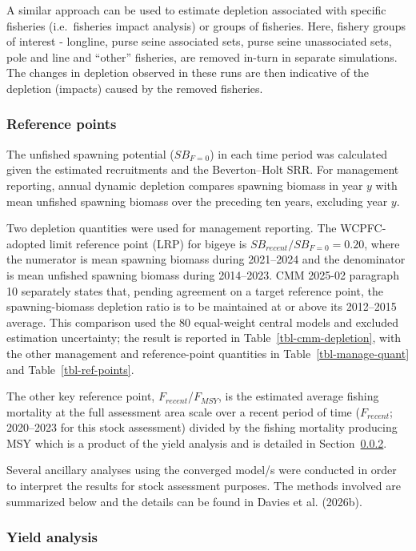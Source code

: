 \documentclass[
  english,
  a4paper,
  a4paper,
  11pt]{SCreport}
\begin{document}
A similar approach can be used to estimate depletion associated with
specific fisheries (i.e.~fisheries impact analysis) or groups of
fisheries. Here, fishery groups of interest - longline, purse seine
associated sets, purse seine unassociated sets, pole and line and
``other'' fisheries, are removed in-turn in separate simulations. The
changes in depletion observed in these runs are then indicative of the
depletion (impacts) caused by the removed fisheries.

\subsubsection{Reference points}\label{sec-methods-reference-points}

The unfished spawning potential (\(SB_{F=0}\)) in each time period was
calculated given the estimated recruitments and the Beverton--Holt SRR.
For management reporting, annual dynamic depletion compares spawning
biomass in year \(y\) with mean unfished spawning biomass over the
preceding ten years, excluding year \(y\).

Two depletion quantities were used for management reporting. The
WCPFC-adopted limit reference point (LRP) for bigeye is
\(SB_{recent}/SB_{F=0}=0.20\), where the numerator is mean spawning
biomass during 2021--2024 and the denominator is mean unfished spawning
biomass during 2014--2023. CMM 2025-02 paragraph 10 separately states
that, pending agreement on a target reference point, the
spawning-biomass depletion ratio is to be maintained at or above its
2012--2015 average. This comparison used the 80 equal-weight central
models and excluded estimation uncertainty; the result is reported in
Table~\ref{tbl-cmm-depletion}, with the other management and
reference-point quantities in Table~\ref{tbl-manage-quant} and
Table~\ref{tbl-ref-points}.

The other key reference point, \(F_{recent}\)/\(F_{MSY}\), is the
estimated average fishing mortality at the full assessment area scale
over a recent period of time (\(F_{recent}\); 2020--2023 for this stock
assessment) divided by the fishing mortality producing MSY which is a
product of the yield analysis and is detailed in
Section~\ref{sec-method-yield}.

Several ancillary analyses using the converged model/s were conducted in
order to interpret the results for stock assessment purposes. The
methods involved are summarized below and the details can be found in
Davies et al. (2026b).

\subsubsection{Yield analysis}\label{sec-method-yield}
\end{document}
